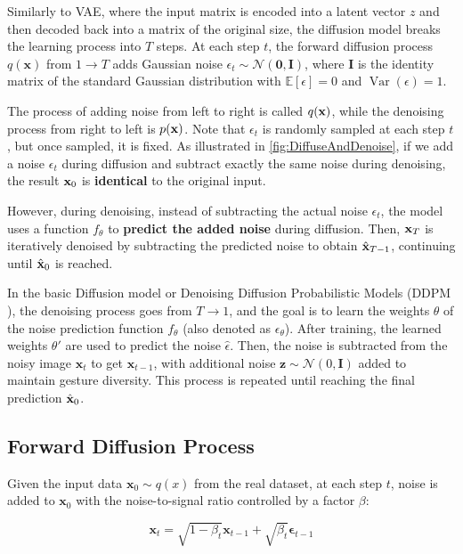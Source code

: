 Similarly to VAE, where the input matrix is encoded into a latent vector $z$ and then decoded back into a matrix of the original size, the diffusion model breaks the learning process into $T$ steps. At each step $t$, the forward diffusion process $q(\mathbf{x})$ from $1 \to T$ adds Gaussian noise $\epsilon_t \sim \mathcal{N}(\mathbf{0}, \mathbf{I})$, where $\mathbf{I}$ is the identity matrix of the standard Gaussian distribution with $\mathbb{E}[\epsilon] = 0$ and $\operatorname{Var}(\epsilon) = 1$.

The process of adding noise from left to right is called $q(\mathbf{x})$, while the denoising process from right to left is $p(\mathbf{x})$. Note that $\epsilon_t$ is randomly sampled at each step $t$, but once sampled, it is fixed. As illustrated in \autoref{fig:DiffuseAndDenoise}, if we add a noise $\epsilon_t$ during diffusion and subtract exactly the same noise during denoising, the result $\mathbf{x}_0$ is \textbf{identical} to the original input.

However, during denoising, instead of subtracting the actual noise $\epsilon_t$, the model uses a function $f_{\theta}$ to \textbf{predict the added noise} during diffusion. Then, $\mathbf{x}_T$ is iteratively denoised by subtracting the predicted noise to obtain $\hat{\mathbf{x}}_{T-1}$, continuing until $\hat{\mathbf{x}}_0$ is reached.

In the basic Diffusion model or Denoising Diffusion Probabilistic Models (DDPM \cite{ho2020denoising}), the denoising process goes from $T \to 1$, and the goal is to learn the weights $\theta$ of the noise prediction function $f_{\theta}$ (also denoted as $\epsilon_\theta$). After training, the learned weights $\theta'$ are used to predict the noise $\hat{\epsilon}$. Then, the noise is subtracted from the noisy image $\mathbf{x}_t$ to get $\mathbf{x}_{t-1}$, with additional noise $\mathbf{z} \sim \mathcal{N}(0, \mathbf{I})$ added to maintain gesture diversity. This process is repeated until reaching the final prediction $\hat{\mathbf{x}}_0$.

\subsection{Forward Diffusion Process}

Given the input data $\mathbf{x}_0 \sim q(x)$ from the real dataset, at each step $t$, noise is added to $\mathbf{x}_{0}$ with the noise-to-signal ratio controlled by a factor $\beta$:

\begin{equation}
	\label{eq:addgaussian}
	\mathbf{x}_t = \sqrt{1 - \beta_t}\mathbf{x}_{t-1} + \sqrt{\beta_t} \boldsymbol{\epsilon}_{t-1}
\end{equation}

